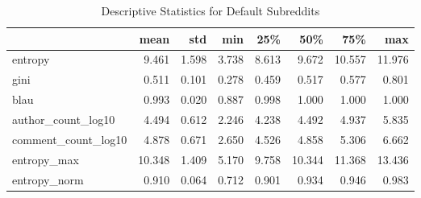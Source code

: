\begin{table}
\centering
\begin{tabular}{lrrrrrrr}
\toprule
{} &   mean &   std &   min &   25\% &    50\% &    75\% &    max \\
\midrule
entropy             &  9.461 & 1.598 & 3.738 & 8.613 &  9.672 & 10.557 & 11.976 \\
gini                &  0.511 & 0.101 & 0.278 & 0.459 &  0.517 &  0.577 &  0.801 \\
blau                &  0.993 & 0.020 & 0.887 & 0.998 &  1.000 &  1.000 &  1.000 \\
author\_count\_log10  &  4.494 & 0.612 & 2.246 & 4.238 &  4.492 &  4.937 &  5.835 \\
comment\_count\_log10 &  4.878 & 0.671 & 2.650 & 4.526 &  4.858 &  5.306 &  6.662 \\
entropy\_max         & 10.348 & 1.409 & 5.170 & 9.758 & 10.344 & 11.368 & 13.436 \\
entropy\_norm        &  0.910 & 0.064 & 0.712 & 0.901 &  0.934 &  0.946 &  0.983 \\
\bottomrule
\end{tabular}
\caption{Descriptive Statistics for Default Subreddits}
\label{table/defaults}
\end{table}